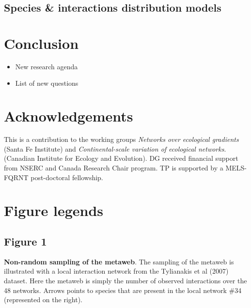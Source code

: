 \documentclass[12pt]{article}
\begin{document}

\subsection*{Species \& interactions distribution models}

\newpage
\section*{Conclusion}

\begin{itemize}
\item New research agenda\\

\item List of new questions \\
\end{itemize}

\newpage
\section*{Acknowledgements}
This is a contribution to the working groups \emph{Networks over ecological
gradients} (Santa Fe Institute) and \emph{Continental-scale variation of
ecological networks}. (Canadian Institute for Ecology and Evolution). DG
received financial support from NSERC and Canada Research Chair program. TP
is supported by a MELS-FQRNT post-doctoral fellowship.
\newpage

\printbibliography

\newpage
\section*{Figure legends}

\subsection*{Figure 1}
\textbf{Non-random sampling of the metaweb}. The sampling of the metaweb is illustrated with a local interaction network from the Tylianakis et al (2007) dataset. Here the metaweb is simply the number of observed interactions over the 48 networks. Arrows points to species that are present in the local network \#34 (represented on the right).  
\end{document}
